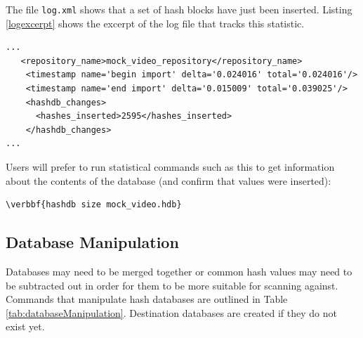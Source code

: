 \documentclass[11pt,fleqn]{article} %
\begin{document}
The file \texttt{log.xml} shows that a set of hash blocks have just been inserted. Listing \ref{logexcerpt} shows the excerpt of the log file that tracks this statistic.
\lstset{style=customfile}
\begin{lstlisting}[float, caption=Excerpt of the \texttt{log.xml} indicating hash blocks were inserted, label=logexcerpt]
...   
   <repository_name>mock_video_repository</repository_name>
    <timestamp name='begin import' delta='0.024016' total='0.024016'/>
    <timestamp name='end import' delta='0.015009' total='0.039025'/>
    <hashdb_changes>
      <hashes_inserted>2595</hashes_inserted>      
    </hashdb_changes>
...
\end{lstlisting}
Users will prefer to run statistical commands such as this to get information about the contents of the database (and confirm that values were inserted):
\begin{Verbatim}[commandchars=\\\{\}]
\verbbf{hashdb size mock_video.hdb}
\end{Verbatim}

\subsection{Database Manipulation}
\label{DatabaseManipulation}
Databases may need to be merged together or common hash values may need to be subtracted out in order for them to be more suitable for scanning against.
Commands that manipulate hash databases are outlined in Table \ref{tab:databaseManipulation}.
Destination databases are created if they do not exist yet.
\end{document}
